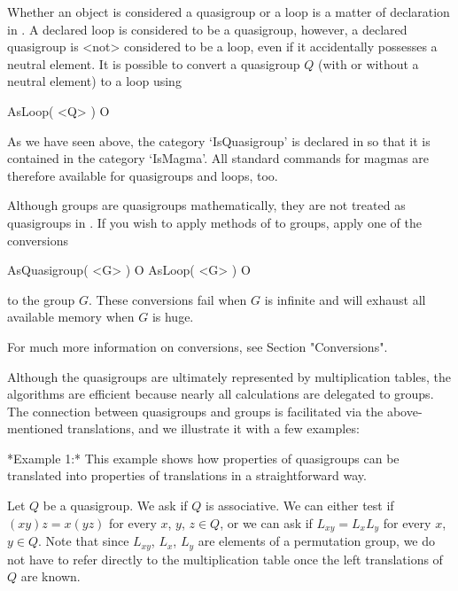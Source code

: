 
Whether an object is considered a quasigroup or a loop is a matter of
declaration in {\LOOPS}. A declared loop is considered to be a quasigroup,
however, a declared quasigroup is <not> considered to be a loop, even if it
accidentally possesses a neutral element. It is possible to convert a
quasigroup $Q$ (with or without a neutral element) to a loop using

\>AsLoop( <Q> ) O

As we have seen above, the category `IsQuasigroup' is declared in {\LOOPS} so
that it is contained in the category `IsMagma'. All standard {\GAP} commands
for magmas are therefore available for quasigroups and loops, too.

Although groups are quasigroups mathematically, they are not treated as
quasigroups in {\LOOPS}. If you wish to apply methods of {\LOOPS} to groups,
apply one of the conversions

\>AsQuasigroup( <G> ) O
\>AsLoop( <G> ) O

to the group $G$. These conversions fail when $G$ is infinite and will exhaust
all available memory when $G$ is huge.

For much more information on conversions, see Section "Conversions".



Although the quasigroups are ultimately represented by multiplication tables,
the algorithms are efficient because nearly all calculations are delegated to
groups. The connection between quasigroups and groups is facilitated via the
above-mentioned translations, and we illustrate it with a few examples:

\medskip

*Example 1:* This example shows how properties of quasigroups can be translated
into properties of translations in a straightforward way.

Let $Q$ be a quasigroup. We ask if $Q$ is associative. We can either test if
$(xy)z=x(yz)$ for every $x$, $y$, $z\in Q$, or we can ask if $L_{xy}=L_xL_y$
for every $x$, $y\in Q$. Note that since $L_{xy}$, $L_x$, $L_y$ are elements of
a permutation group, we do not have to refer directly to the multiplication
table once the left translations of $Q$ are known.

